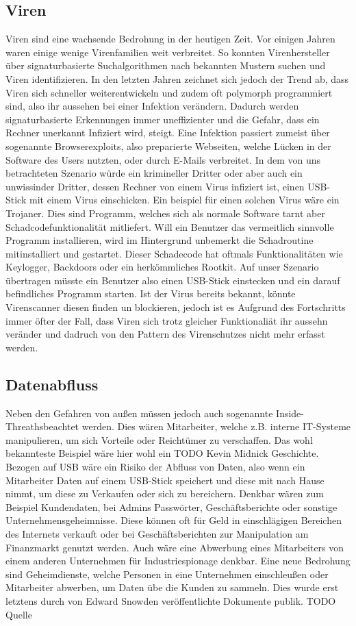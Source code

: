 \subsection{Viren}
Viren sind eine wachsende Bedrohung in der heutigen Zeit. Vor einigen Jahren waren einige wenige Virenfamilien weit verbreitet. So konnten Virenhersteller über signaturbasierte Suchalgorithmen nach bekannten Mustern suchen und Viren identifizieren. In den letzten Jahren zeichnet sich jedoch der Trend ab, dass Viren sich schneller weiterentwickeln und zudem oft polymorph programmiert sind, also ihr aussehen bei einer Infektion verändern. Dadurch werden signaturbasierte Erkennungen immer uneffizienter und die Gefahr, dass ein Rechner unerkannt Infiziert wird, steigt. Eine Infektion passiert zumeist über sogenannte Browserexploits, also preparierte Webseiten, welche Lücken in der Software des Users nutzten, oder durch E-Mails verbreitet. In dem von uns betrachteten Szenario würde ein krimineller Dritter oder aber auch ein unwissinder Dritter, dessen Rechner von einem Virus infiziert ist, einen USB-Stick mit einem Virus einschicken. Ein beispiel für einen solchen Virus wäre ein Trojaner. Dies sind Programm, welches sich als normale Software tarnt aber Schadcodefunktionalität mitliefert. \cite{Stamp2006} Will ein Benutzer das vermeitlich sinnvolle Programm installieren, wird im Hintergrund unbemerkt die Schadroutine mitinstalliert und gestartet. Dieser Schadecode hat oftmals Funktionalitäten wie Keylogger, Backdoors oder ein herkömmliches Rootkit. Auf unser Szenario übertragen müsste ein Benutzer also einen USB-Stick einstecken und ein darauf befindliches Programm starten. Ist der Virus bereits bekannt, könnte Virenscanner diesen finden un blockieren, jedoch ist es Aufgrund des Fortschritts immer öfter der Fall, dass Viren sich trotz gleicher Funktionaliät ihr aussehn veränder und dadruch von den Pattern des Virenschutzes nicht mehr erfasst werden.

			
\subsection{Datenabfluss}
Neben den Gefahren von außen müssen jedoch auch sogenannte \glqq Inside-Threaths\grqq beachtet werden. Dies wären Mitarbeiter, welche z.B. interne IT-Systeme manipulieren, um sich Vorteile oder Reichtümer zu verschaffen. Das wohl bekannteste Beispiel wäre hier wohl ein TODO Kevin Midnick Geschichte. Bezogen auf USB wäre ein Risiko der Abfluss von Daten, also wenn ein Mitarbeiter Daten auf einem USB-Stick speichert und diese mit nach Hause nimmt, um diese zu Verkaufen oder sich zu bereichern. Denkbar wären zum Beispiel Kundendaten, bei Admins Passwörter, Geschäftsberichte oder sonstige Unternehmensgeheimnisse. Diese können oft für Geld in einschlägigen Bereichen des Internets verkauft oder bei Geschäftsberichten zur Manipulation am Finanzmarkt genutzt werden. Auch wäre eine Abwerbung eines Mitarbeiters von einem anderen Unternehmen für Industriespionage denkbar.
Eine neue Bedrohung sind Geheimdienste, welche Personen in eine Unternehmen einschleußen oder Mitarbeiter abwerben, um Daten übe die Kunden zu sammeln. Dies wurde erst letztens durch von Edward Snowden veröffentlichte Dokumente publik. TODO Quelle



